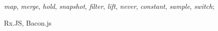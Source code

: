 {\tiny\begin{description}[noitemsep]
  \item [As 10 Primitivas Básicas] \emph{map}, \emph{merge}, \emph{hold},
    \emph{snapshot}, \emph{filter}, \emph{lift}, \emph{never}, \emph{constant},
    \emph{sample}, \emph{switch};
  \item [Combinação de Primitivas]
  \item [Arcabouços \emph{(Frameworks)}] Rx.JS, Bacon.js
\end{description}}


